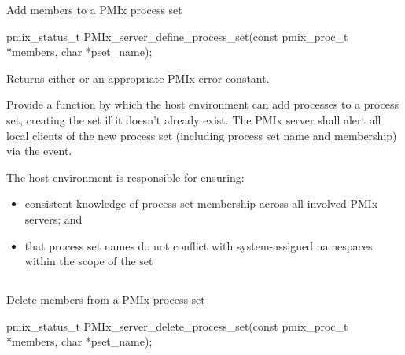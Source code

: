 Add members to a \ac{PMIx} process set

\format

\cspecificstart
\begin{codepar}
pmix_status_t
PMIx_server_define_process_set(const pmix_proc_t *members,
                               char *pset_name);
\end{codepar}
\cspecificend

\begin{arglist}
\end{arglist}

Returns either  or an appropriate \ac{PMIx} error constant.


\descr

Provide a function by which the host environment can add processes to a
process set, creating the set if it doesn't already exist. The \ac{PMIx}
server shall alert all local clients of the new process set (including process
set name and membership) via the  event.

\advicermstart
The host environment is responsible for ensuring:

\begin{itemize}
    \item consistent knowledge of process set membership across all involved
    \ac{PMIx} servers; and
    \item that process set names do not conflict with system-assigned
    namespaces within the scope of the set
\end{itemize}

\advicermend

\subsection{}

\summary

Delete members from a \ac{PMIx} process set

\format

\cspecificstart
\begin{codepar}
pmix_status_t
PMIx_server_delete_process_set(const pmix_proc_t *members,
                               char *pset_name);
\end{codepar}
\cspecificend

